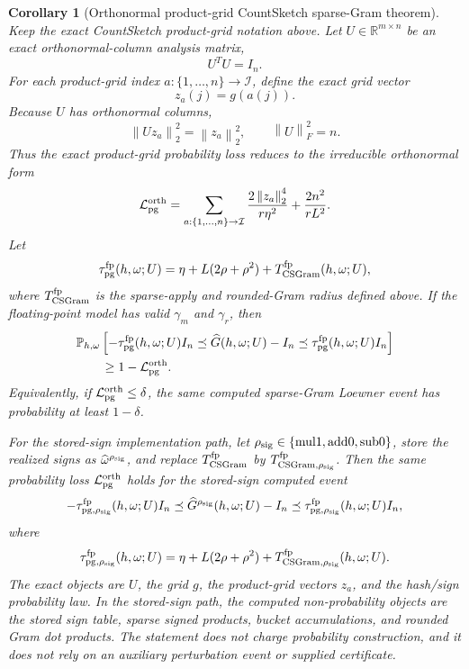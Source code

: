 \documentclass[11pt]{article}
\newcommand{\R}{\mathbb{R}}
\newcommand{\Prob}{\mathbb{P}}
\newcommand{\Frob}[1]{\left\lVert #1\right\rVert_F}
\newcommand{\Norm}[1]{\left\lVert #1\right\rVert_2}
\newcommand{\I}{I}
\newtheorem{corollary}[theorem]{Corollary}
\theoremstyle{remark}
\begin{document}
\begin{corollary}[Orthonormal product-grid CountSketch sparse-Gram theorem]
Keep the exact CountSketch product-grid notation above.  Let
\(U\in\R^{m\times n}\) be an exact orthonormal-column analysis matrix,
\[
  U^TU=\I_n .
\]
For each product-grid index \(a:\{1,\ldots,n\}\to\mathcal I\), define the
exact grid vector
\[
  z_a(j)=g(a(j)).
\]
Because \(U\) has orthonormal columns,
\[
  \Norm{Uz_a}^2=\Norm{z_a}^2,
  \qquad
  \Frob{U}^2=n .
\]
Thus the exact product-grid probability loss reduces to the irreducible
orthonormal form
\[
  \mathcal L_{\rm pg}^{\rm orth}
  =
  \sum_{a:\{1,\ldots,n\}\to\mathcal I}
    \frac{2\Norm{z_a}^4}{r\eta^2}
  +
    \frac{2n^2}{rL^2}.
\]
Let
\[
  \tau_{\rm pg}^{\rm fp}(h,\omega;U)
  =
  \eta+L(2\rho+\rho^2)+T_{\rm CSGram}^{\rm fp}(h,\omega;U),
\]
where \(T_{\rm CSGram}^{\rm fp}\) is the sparse-apply and rounded-Gram
radius defined above.  If the floating-point model has valid \(\gamma_m\) and
\(\gamma_r\), then
\[
\begin{aligned}
&\Prob_{h,\omega}
  \left[
    -\tau_{\rm pg}^{\rm fp}(h,\omega;U)\I_n
    \preceq
    \widehat G(h,\omega;U)-\I_n
    \preceq
    \tau_{\rm pg}^{\rm fp}(h,\omega;U)\I_n
  \right]
\\
&\qquad\ge
  1-\mathcal L_{\rm pg}^{\rm orth}.
\end{aligned}
\]
Equivalently, if \(\mathcal L_{\rm pg}^{\rm orth}\le\delta\), the same
computed sparse-Gram Loewner event has probability at least \(1-\delta\).

For the stored-sign implementation path, let
\(\rho_{\rm sig}\in\{\mathrm{mul1},\mathrm{add0},\mathrm{sub0}\}\), store the
realized signs as \(\widehat\omega^{\rho_{\rm sig}}\), and replace
\(T_{\rm CSGram}^{\rm fp}\) by
\(T_{{\rm CSGram},\rho_{\rm sig}}^{\rm fp}\).  Then the same probability loss
\(\mathcal L_{\rm pg}^{\rm orth}\) holds for the stored-sign computed event
\[
  -\tau_{{\rm pg},\rho_{\rm sig}}^{\rm fp}(h,\omega;U)\I_n
  \preceq
  \widehat G^{\rho_{\rm sig}}(h,\omega;U)-\I_n
  \preceq
  \tau_{{\rm pg},\rho_{\rm sig}}^{\rm fp}(h,\omega;U)\I_n,
\]
where
\[
  \tau_{{\rm pg},\rho_{\rm sig}}^{\rm fp}(h,\omega;U)
  =
  \eta+L(2\rho+\rho^2)
  +
  T_{{\rm CSGram},\rho_{\rm sig}}^{\rm fp}(h,\omega;U).
\]
The exact objects are \(U\), the grid \(g\), the product-grid vectors \(z_a\),
and the hash/sign probability law.  In the stored-sign path, the computed
non-probability objects are the stored sign table, sparse signed products,
bucket accumulations, and rounded Gram dot products.  The statement does not
charge probability construction, and it does not rely on an auxiliary
perturbation event or supplied certificate.


\end{corollary}
\end{document}

